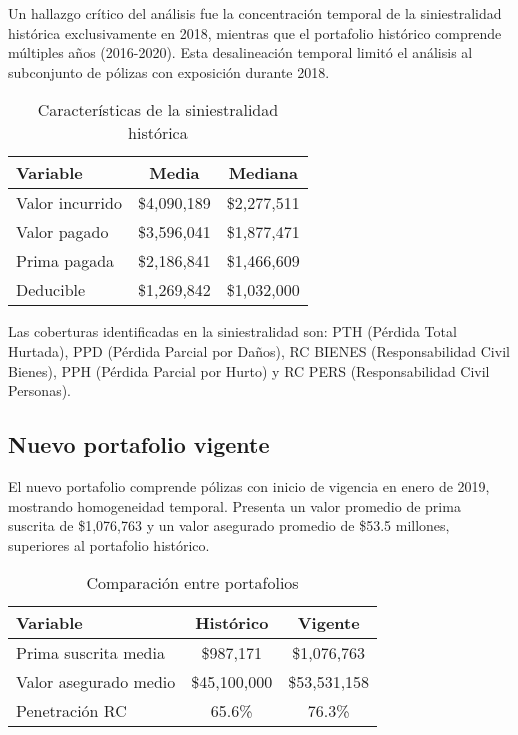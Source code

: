 Un hallazgo crítico del análisis fue la concentración temporal de la siniestralidad histórica exclusivamente en 2018, mientras que el portafolio histórico comprende múltiples años (2016-2020). Esta desalineación temporal limitó el análisis al subconjunto de pólizas con exposición durante 2018.

\begin{table}[H]
\centering
\caption{Características de la siniestralidad histórica}
\begin{tabular}{lcc}
\hline
\textbf{Variable} & \textbf{Media} & \textbf{Mediana} \\
\hline
Valor incurrido & \$4,090,189 & \$2,277,511 \\
Valor pagado & \$3,596,041 & \$1,877,471 \\
Prima pagada & \$2,186,841 & \$1,466,609 \\
Deducible & \$1,269,842 & \$1,032,000 \\
\hline
\end{tabular}
\end{table}

Las coberturas identificadas en la siniestralidad son: PTH (Pérdida Total Hurtada), PPD (Pérdida Parcial por Daños), RC BIENES (Responsabilidad Civil Bienes), PPH (Pérdida Parcial por Hurto) y RC PERS (Responsabilidad Civil Personas).

\subsection{Nuevo portafolio vigente}

El nuevo portafolio comprende pólizas con inicio de vigencia en enero de 2019, mostrando homogeneidad temporal. Presenta un valor promedio de prima suscrita de \$1,076,763 y un valor asegurado promedio de \$53.5 millones, superiores al portafolio histórico.

\begin{table}[H]
\centering
\caption{Comparación entre portafolios}
\begin{tabular}{lcc}
\hline
\textbf{Variable} & \textbf{Histórico} & \textbf{Vigente} \\
\hline
Prima suscrita media & \$987,171 & \$1,076,763 \\
Valor asegurado medio & \$45,100,000 & \$53,531,158 \\
Penetración RC & 65.6\% & 76.3\% \\
\hline
\end{tabular}
\end{table}

